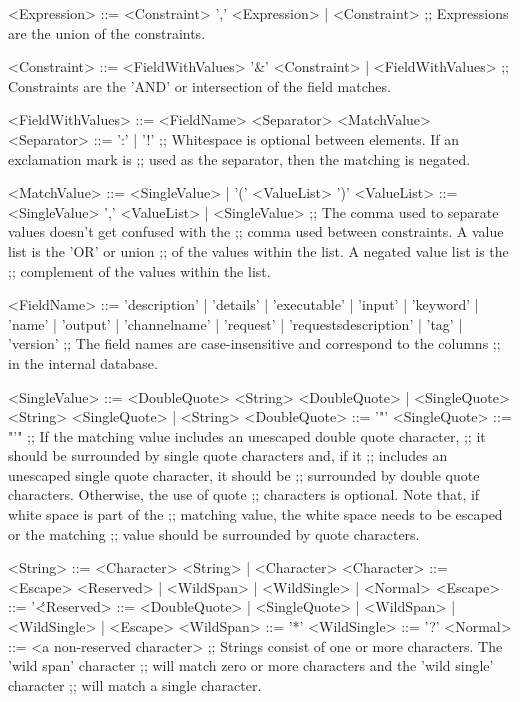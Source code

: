 \begin{listing}[5]{1}
<Expression> ::= <Constraint> ',' <Expression> | <Constraint>
;; Expressions are the union of the constraints.

<Constraint> ::= <FieldWithValues> '&' <Constraint> | <FieldWithValues>
;; Constraints are the 'AND' or intersection of the field matches.

<FieldWithValues> ::= <FieldName> <Separator> <MatchValue>
<Separator> ::= ':' | '!'
;; Whitespace is optional between elements. If an exclamation mark is
;; used as the separator, then the matching is negated.

<MatchValue> ::= <SingleValue> | '(' <ValueList> ')'
<ValueList> ::= <SingleValue> ',' <ValueList> | <SingleValue>
;; The comma used to separate values doesn't get confused with the
;; comma used between constraints. A value list is the 'OR' or union
;; of the values within the list. A negated value list is the
;; complement of the values within the list.

<FieldName> ::= 'description' | 'details' | 'executable' | 'input' |
                'keyword' | 'name' | 'output' | 'channelname' |
                'request' | 'requestsdescription' | 'tag' | 'version'
;; The field names are case-insensitive and correspond to the columns
;; in the internal database.

<SingleValue> ::= <DoubleQuote> <String> <DoubleQuote> |
                  <SingleQuote> <String> <SingleQuote> | <String>
<DoubleQuote> ::= '"'
<SingleQuote> ::= "'"
;; If the matching value includes an unescaped double quote character,
;; it should be surrounded by single quote characters and, if it
;; includes an unescaped single quote character, it should be
;; surrounded by double quote characters. Otherwise, the use of quote
;; characters is optional. Note that, if white space is part of the
;; matching value, the white space needs to be escaped or the matching
;; value should be surrounded by quote characters.

<String> ::= <Character> <String> | <Character>
<Character> ::= <Escape> <Reserved> | <WildSpan> | <WildSingle> |
                <Normal>
<Escape> ::= '\'
<Reserved> ::= <DoubleQuote> | <SingleQuote> | <WildSpan> |
               <WildSingle> | <Escape>
<WildSpan> ::= '*'
<WildSingle> ::= '?'
<Normal> ::= <a non-reserved character>
;; Strings consist of one or more characters. The 'wild span' character
;; will match zero or more characters and the 'wild single' character
;; will match a single character.
\end{listing}
\outputEnd
{}
\appendixEnd{}
